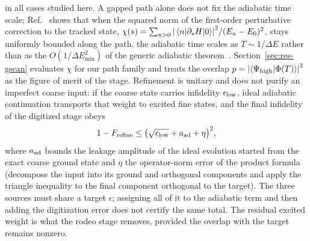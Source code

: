 \documentclass[
  aps,            %
  prc,            %
  reprint,        %
  superscriptaddress,
  floatfix,
  nofootinbib
]{revtex4-2}
\begin{document}
in all cases studied here.  A gapped path alone does not fix the adiabatic
time scale; Ref.~\cite{Bogner2026} shows that when the squared norm of the
first-order perturbative correction to the tracked state,
$\chi(s)=\sum_{n>0}\abs{\mel{n}{\partial_sH}{0}}^2/(E_n-E_0)^2$, stays
uniformly bounded along the path, the adiabatic time scales as
$T\sim1/\Delta E$ rather than as the $O(1/\Delta E_{\min}^2)$ of the generic
adiabatic theorem~\cite{Albash2018}.  Section~\ref{sec:res-gscan} evaluates
$\chi$ for our path family and treats the overlap
$p=\abs{\braket{\Psi_{\rm high}}{\Phi(T)}}^2$ as the figure of merit of the
stage.  Refinement is unitary and does not purify an imperfect coarse
input: if the coarse state carries infidelity $\epsilon_{\rm low}$, ideal
adiabatic continuation transports that weight to excited fine states, and the
final infidelity of the digitized stage obeys
\begin{equation}
  1-F_{\rm refine}\le\big(\sqrt{\epsilon_{\rm low}}+a_{\rm ad}+\eta\big)^2,
  \label{eq:budget}
\end{equation}
where $a_{\rm ad}$ bounds the leakage amplitude of the ideal evolution started
from the exact coarse ground state and $\eta$ the operator-norm error of the
product formula (decompose the input into its ground and orthogonal
components and apply the triangle inequality to the final component
orthogonal to the target).  The three sources must share a target
$\epsilon$; assigning all of it to the adiabatic term and then adding the
digitization error does not certify the same total.  The residual excited
weight is what the rodeo stage removes, provided the overlap with the target
remains nonzero.
\end{document}
